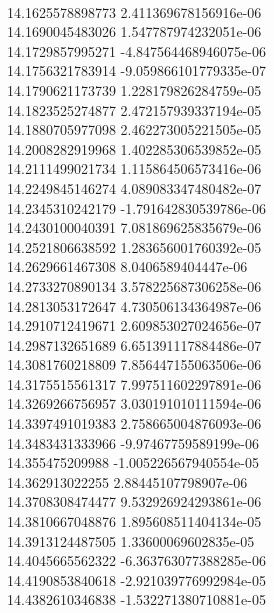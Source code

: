 { \\
14.1625578898773 2.411369678156916e-06
 \\
14.1690045483026 1.547787974232051e-06
 \\
14.1729857995271 -4.847564468946075e-06
 \\
14.1756321783914 -9.059866101779335e-07
 \\
14.1790621173739 1.228179826284759e-05
 \\
14.1823525274877 2.472157939337194e-05
 \\
14.1880705977098 2.462273005221505e-05
 \\
14.2008282919968 1.402285306539852e-05
 \\
14.2111499021734 1.115864506573416e-06
 \\
14.2249845146274 4.089083347480482e-07
 \\
14.2345310242179 -1.791642830539786e-06
 \\
14.2430100040391 7.081869625835679e-06
 \\
14.2521806638592 1.283656001760392e-05
 \\
14.2629661467308 8.0406589404447e-06
 \\
14.2733270890134 3.578225687306258e-06
 \\
14.2813053172647 4.730506134364987e-06
 \\
14.2910712419671 2.609853027024656e-07
 \\
14.2987132651689 6.651391117884486e-07
 \\
14.3081760218809 7.856447155063506e-06
 \\
14.3175515561317 7.997511602297891e-06
 \\
14.3269266756957 3.030191010111594e-06
 \\
14.3397491019383 2.758665004876093e-06
 \\
14.3483431333966 -9.97467759589199e-06
 \\
14.355475209988 -1.005226567940554e-05
 \\
14.362913022255 2.88445107798907e-06
 \\
14.3708308474477 9.532926924293861e-06
 \\
14.3810667048876 1.895608511404134e-05
 \\
14.3913124487505 1.33600069602835e-05
 \\
14.4045665562322 -6.363763077388285e-06
 \\
14.4190853840618 -2.921039776992984e-05
 \\
14.4382610346838 -1.532271380710881e-05
 \\
}
